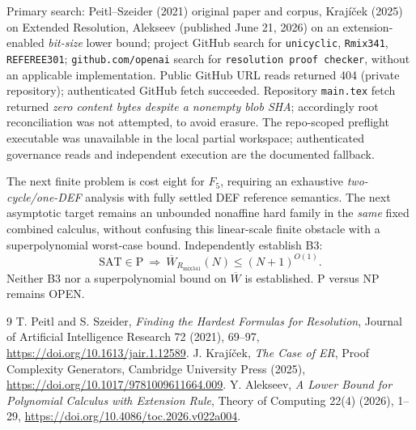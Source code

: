 \documentclass[11pt]{article}
\begin{document}
Primary search: Peitl--Szeider (2021) original paper and corpus, Kraj\'i\v{c}ek (2025) on Extended Resolution, Alekseev (published June 21, 2026) on an extension-enabled \emph{bit-size} lower bound; project GitHub search for \texttt{unicyclic}, \texttt{Rmix341}, \texttt{REFEREE301}; \texttt{github.com/openai} search for \texttt{resolution proof checker}, without an applicable implementation. Public GitHub URL reads returned 404 (private repository); authenticated GitHub fetch succeeded. Repository \texttt{main.tex} fetch returned \emph{zero content bytes despite a nonempty blob SHA}; accordingly root reconciliation was not attempted, to avoid erasure. The repo-scoped preflight executable was unavailable in the local partial workspace; authenticated governance reads and independent execution are the documented fallback.

The next finite problem is cost eight for $F_5$, requiring an exhaustive \emph{two-cycle/one-DEF} analysis with fully settled DEF reference semantics. The next asymptotic target remains an unbounded nonaffine hard family in the \emph{same} fixed combined calculus, without confusing this linear-scale finite obstacle with a superpolynomial worst-case bound. Independently establish B3:
\[
\mathrm{SAT}\in\mathrm P\ \Longrightarrow\ \overline W_{R_{\mathrm{mix341}}}(N)\le(N+1)^{O(1)}.
\]
Neither B3 nor a superpolynomial bound on $\overline W$ is established. P versus NP remains OPEN.

\begin{thebibliography}{9}
 T. Peitl and S. Szeider, \emph{Finding the Hardest Formulas for Resolution}, Journal of Artificial Intelligence Research 72 (2021), 69--97, \url{https://doi.org/10.1613/jair.1.12589}.
 J. Kraj\'i\v{c}ek, \emph{The Case of ER}, Proof Complexity Generators, Cambridge University Press (2025), \url{https://doi.org/10.1017/9781009611664.009}.
 Y. Alekseev, \emph{A Lower Bound for Polynomial Calculus with Extension Rule}, Theory of Computing 22(4) (2026), 1--29, \url{https://doi.org/10.4086/toc.2026.v022a004}.
\end{thebibliography}
\end{document}

